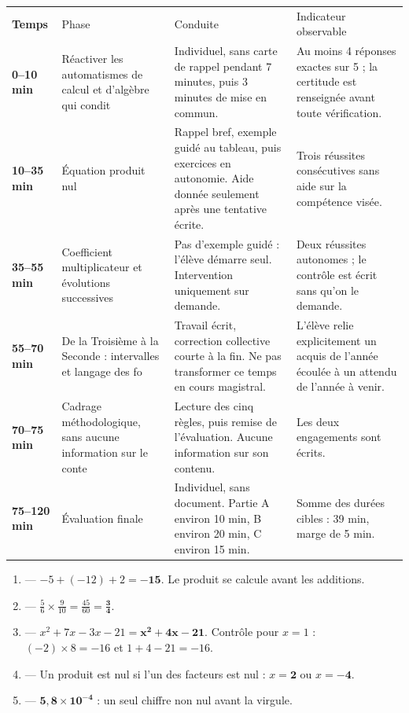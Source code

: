 \documentclass[10pt,a4paper]{article}
\begin{document}
\par\noindent\begin{tabularx}{\linewidth}{>{\bfseries}p{18mm} p{34mm} X X}
\rowcolor{Navy}\color{white}Temps & \color{white}Phase & \color{white}Conduite & \color{white}Indicateur observable \\
0--10 min & Réactiver les automatismes de calcul et d'algèbre qui condit & Individuel, sans carte de rappel pendant 7 minutes, puis 3 minutes de mise en commun. & Au moins 4 réponses exactes sur 5 ; la certitude est renseignée avant toute vérification. \\
10--35 min & Équation produit nul & Rappel bref, exemple guidé au tableau, puis exercices en autonomie. Aide donnée seulement après une tentative écrite. & Trois réussites consécutives sans aide sur la compétence visée. \\
35--55 min & Coefficient multiplicateur et évolutions successives & Pas d'exemple guidé : l'élève démarre seul. Intervention uniquement sur demande. & Deux réussites autonomes ; le contrôle est écrit sans qu'on le demande. \\
55--70 min & De la Troisième à la Seconde : intervalles et langage des fo & Travail écrit, correction collective courte à la fin. Ne pas transformer ce temps en cours magistral. & L'élève relie explicitement un acquis de l'année écoulée à un attendu de l'année à venir. \\
70--75 min & Cadrage méthodologique, sans aucune information sur le conte & Lecture des cinq règles, puis remise de l'évaluation. Aucune information sur son contenu. & Les deux engagements sont écrits. \\
75--120 min & Évaluation finale & Individuel, sans document. Partie A environ 10 min, B environ 20 min, C environ 15 min. & Somme des durées cibles : 39 min, marge de 5 min. \\
\end{tabularx}
\newpage{}
\begin{enumerate}
\item {} --- $-5 + (-12) + 2 = \mathbf{-15}$. Le produit se calcule avant les additions.
\item {} --- $\frac{5}{6}\times\frac{9}{10}=\frac{45}{60}=\mathbf{\frac{3}{4}}$.
\item {} --- $x^2+7x-3x-21=\mathbf{x^2+4x-21}$. Contrôle pour $x=1$ : $(-2)\times 8=-16$ et $1+4-21=-16$.
\item {} --- Un produit est nul si l'un des facteurs est nul : $x=\mathbf{2}$ ou $x=\mathbf{-4}$.
\item {} --- $\mathbf{5{,}8\times 10^{-4}}$ : un seul chiffre non nul avant la virgule.
\end{enumerate}
\end{document}
